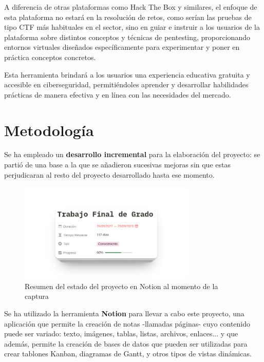         A diferencia de otras plataformas como Hack The Box y similares, el enfoque de esta plataforma no estará en la resolución de retos, como serían las pruebas de tipo CTF más habituales en el sector, sino en guiar e instruir a los usuarios de la plataforma sobre distintos conceptos y técnicas de pentesting, proporcionando entornos virtuales diseñados específicamente para experimentar y poner en práctica conceptos concretos.
        
        Esta herramienta brindará a los usuarios una experiencia educativa gratuita y accesible en ciberseguridad, permitiéndoles aprender y desarrollar habilidades prácticas de manera efectiva y en línea con las necesidades del mercado.
    
    
    \section{Metodología}
    
        Se ha empleado un \textbf{desarrollo incremental} para la elaboración del proyecto: se partió de una base a la que se añadieron sucesivas mejoras sin que estas perjudicaran al resto del proyecto desarrollado hasta ese momento.

        \begin{figure}[htbp]
            \centering

            \includegraphics[width=0.75\textwidth]{images/Capturas/Notion resumen.png}
            \caption{Resumen del estado del proyecto en Notion al momento de la captura}
            \label{fig:notion-resumen}
        \end{figure}

        Se ha utilizado la herramienta \textbf{Notion} para llevar a cabo este proyecto, una aplicación que permite la creación de notas -llamadas páginas- cuyo contenido puede ser variado: texto, imágenes, tablas, listas, archivos, enlaces... y que además, permite la creación de bases de datos que pueden ser utilizadas para crear tablones Kanban, diagramas de Gantt, y otros tipos de vistas dinámicas.

